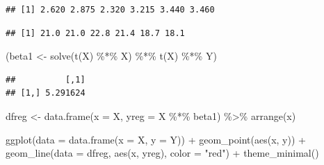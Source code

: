 \documentclass[
  12pt,
]{book}
\newenvironment{Shaded}{\begin{snugshade}}{\end{snugshade}}
\newcommand{\AttributeTok}[1]{\textcolor[rgb]{0.77,0.63,0.00}{#1}}
\newcommand{\FunctionTok}[1]{\textcolor[rgb]{0.00,0.00,0.00}{#1}}
\newcommand{\NormalTok}[1]{#1}
\newcommand{\OtherTok}[1]{\textcolor[rgb]{0.56,0.35,0.01}{#1}}
\newcommand{\SpecialCharTok}[1]{\textcolor[rgb]{0.00,0.00,0.00}{#1}}
\newcommand{\StringTok}[1]{\textcolor[rgb]{0.31,0.60,0.02}{#1}}
\theoremstyle{definition}
\theoremstyle{definition}
\theoremstyle{definition}
\theoremstyle{remark}
\begin{document}
\begin{verbatim}
## [1] 2.620 2.875 2.320 3.215 3.440 3.460
\end{verbatim}

\begin{Shaded}
\end{Shaded}

\begin{verbatim}
## [1] 21.0 21.0 22.8 21.4 18.7 18.1
\end{verbatim}

\begin{Shaded}
\begin{Highlighting}[]
\NormalTok{(beta1 }\OtherTok{\textless{}{-}} \FunctionTok{solve}\NormalTok{(}\FunctionTok{t}\NormalTok{(X) }\SpecialCharTok{\%*\%}\NormalTok{ X) }\SpecialCharTok{\%*\%} \FunctionTok{t}\NormalTok{(X) }\SpecialCharTok{\%*\%}\NormalTok{ Y)}
\end{Highlighting}
\end{Shaded}

\begin{verbatim}
##          [,1]
## [1,] 5.291624
\end{verbatim}

\begin{Shaded}
\begin{Highlighting}[]
\NormalTok{dfreg }\OtherTok{\textless{}{-}} \FunctionTok{data.frame}\NormalTok{(}\AttributeTok{x =}\NormalTok{ X, }\AttributeTok{yreg =}\NormalTok{ X }\SpecialCharTok{\%*\%}\NormalTok{ beta1) }\SpecialCharTok{\%\textgreater{}\%} 
    \FunctionTok{arrange}\NormalTok{(x)}
\end{Highlighting}
\end{Shaded}

\begin{Shaded}
\begin{Highlighting}[]
\FunctionTok{ggplot}\NormalTok{(}\AttributeTok{data =} \FunctionTok{data.frame}\NormalTok{(}\AttributeTok{x =}\NormalTok{ X, }\AttributeTok{y =}\NormalTok{ Y)) }\SpecialCharTok{+} \FunctionTok{geom\_point}\NormalTok{(}\FunctionTok{aes}\NormalTok{(x, }
\NormalTok{    y)) }\SpecialCharTok{+} \FunctionTok{geom\_line}\NormalTok{(}\AttributeTok{data =}\NormalTok{ dfreg, }\FunctionTok{aes}\NormalTok{(x, yreg), }\AttributeTok{color =} \StringTok{"red"}\NormalTok{) }\SpecialCharTok{+} 
    \FunctionTok{theme\_minimal}\NormalTok{()}
\end{Highlighting}
\end{Shaded}
\end{document}
